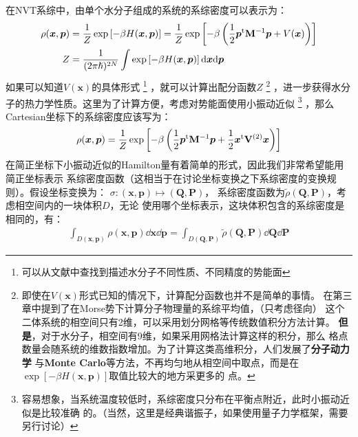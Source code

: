     在NVT系综中，由单个水分子组成的系统的系综密度可以表示为：
    \begin{equation}
        \begin{split}
            \rho(\bm{x}, \bm{p}) &= \frac{1}{Z}\exp\left[-\beta H(\bm{x}, \bm{p})\right]
            = \frac{1}{Z}\exp\left[-\beta\left(\frac{1}{2}\bm{p}^{\mathrm{t}}\mathbf{M}^{-1}\bm{p} + V(\bm{x})\right)\right]\\
            Z &= \frac{1}{(2\pi\hslash)^{2N}}\int\exp\left[-\beta H(\bm{x}, \bm{p})\right]\mathrm{d} \bm{x}\mathrm{d} \bm{p}
        \end{split}
    \end{equation}
    如果可以知道$V(\bm{x})$的具体形式
    \footnote{可以从文献中查找到描述水分子不同性质、不同精度的势能面}
    ，就可以计算出配分函数$Z$
    \footnote{即使在$V(\bm{x})$形式已知的情况下，计算配分函数也并不是简单的事情。
    在第三章中提到了在Morse势下计算分子物理量的系综平均值，（只考虑径向）
    这个二体系统的相空间只有2维，可以采用划分网格等传统数值积分方法计算。
    \textbf{但是}，对于水分子，相空间有9维，如果采用网格法计算这样的积分，那么
    格点数量会随系统的维数指数增加。为了计算这类高维积分，人们发展了\textbf{分子动力学}
    与\textbf{Monte Carlo}等方法，不再均匀地从相空间中取点，而是在
    $\exp\left[-\beta H(\bm{x}, \bm{p})\right]$取值比较大的地方采更多的
    点。}
    ，进一步获得水分子的热力学性质。这里为了计算方便，考虑对势能面使用小振动近似
    \footnote{
        容易想象，当系统温度较低时，系综密度只分布在平衡点附近，此时小振动近似是比较准确
        的。（当然，这里是经典谐振子，如果使用量子力学框架，需要另行讨论）
    }
    ，那么Cartesian坐标下的系综密度应该写为：
    \begin{equation}
        \begin{split}
            \rho(\bm{x}, \bm{p}) = \frac{1}{Z}\exp\left[-\beta\left(
                \frac{1}{2}\bm{p}^{\mathrm{t}}\mathbf{M}^{-1}\bm{p} + \frac{1}{2}\bm{x}^{\mathrm{t}}
                \mathbf{V}^{(2)}\bm{x}
            \right)\right]
        \end{split}
    \end{equation}
    在简正坐标下小振动近似的Hamilton量有着简单的形式，因此我们非常希望能用简正坐标表示
    系综密度函数（这相当于在讨论坐标变换之下系综密度的变换规则）。假设坐标变换为：
    $\sigma: (\bm{x}, \bm{p})\mapsto(\bm{Q}, \bm{P})$，
    系综密度函数为$\tilde{\rho}(\bm{Q}, \bm{P})$，考虑相空间内的一块体积$D$，无论
    使用哪个坐标表示，这块体积包含的系综密度是相同的，有：
    \begin{equation}
        \begin{split}
            \int_{D(\bm{x},\bm{p})}\rho(\bm{x}, \bm{p})\dd \bm{x}\dd \bm{p}
             = \int_{D(\bm{Q}, \bm{P})}\tilde{\rho}(\bm{Q}, \bm{P})\dd \bm{Q}\dd \bm{P}
        \end{split}
    \end{equation}
